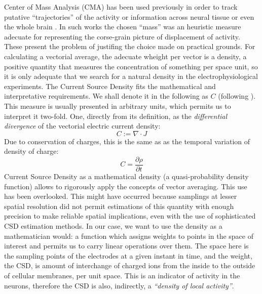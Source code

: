 \documentclass{article}
\begin{document}
Center of Mass Analysis (CMA) has been used previously in order to track putative  ``trajectories'' of the activity or information across neural tissue or even the whole brain \cite{Chao05, Chao07, Manjarrez07, Manjarrez09}. In such works the chosen ``mass'' was an heuristic measure adecuate for representing the corse-grain picture of displacement of activity. These present the problem of justifing the choice made on practical grounds. For calculating a vectorial average, the adecuate wheight per vector is a density, a positive quantity that measures the concentration of something per space unit, so it is only adequate that we search for a natural density in the electrophysiological experiments. The Current Source Density fits the mathematical and interpretative requirements. We shall denote it in the following as $C$ (following \cite{Potworowski2011}).  This measure is usually presented in arbitrary units, which permits us to interpret it two-fold. One, directly from its definition, as the \emph{differential divergence} of the vectorial electric current density:
\begin{equation}
  C:=\nabla \cdot J
\end{equation}
Due to conservation of charges, this is the same as as the temporal variation of density of charge:
\begin{equation}
  C=\frac{\partial \rho}{\partial t}
\end{equation}
Current Source Density as a mathematical density (a quasi-probability density function)  allows  to rigorously apply the concepts of vector averaging. This use has been overlooked. This might have occurred because  samplings at lesser spatial resolution did not permit estimations of this quantity with enough precision to make reliable spatial implications, even with the use of sophisticated CSD estimation methods. In our case, we want to use the density as a mathematician would: a function which assigns weights to points in the space of interest and permits us to carry linear operations over them.  The space here is the sampling points of the electrodes at a given instant in time, and the weight, the CSD, is amount of interchange of charged ions from the inside to the outside of cellular membranes, per unit space.  This is an indicator of activity in the neurons, therefore the CSD is also, indirectly, a \emph{``density of local activity''}.
\end{document}
